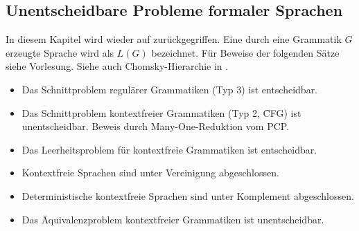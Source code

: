 \subsection{Unentscheidbare Probleme formaler Sprachen}
    In diesem Kapitel wird wieder auf  zurückgegriffen. Eine durch eine Grammatik $G$ erzeugte Sprache wird als $L(G)$ bezeichnet. Für Beweise der folgenden Sätze siehe Vorlesung. Siehe auch Chomsky-Hierarchie in . 
    \begin{itemize}
        \setlength\itemsep{0em}
        \item Das Schnittproblem regulärer Grammatiken (Typ 3) ist entscheidbar.
        \item Das Schnittproblem kontextfreier Grammatiken (Typ 2, \f{CFG}) ist unentscheidbar. Beweis durch Many-One-Reduktion vom PCP.
        \item Das Leerheitsproblem für kontextfreie Grammatiken ist entscheidbar.
        \item Kontextfreie Sprachen sind unter Vereinigung abgeschlossen.
        \item Deterministische kontextfreie Sprachen sind unter Komplement abgeschlossen.
        \item Das Äquivalenzproblem kontextfreier Grammatiken ist unentscheidbar.
    \end{itemize}


\newpage
